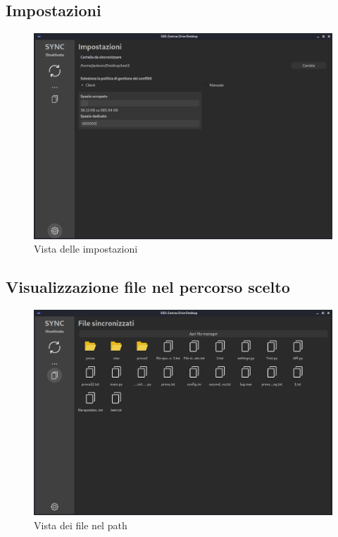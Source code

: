 \subsection{Impostazioni}
\begin{figure}[H]
    \centering
    \includegraphics[scale = 0.30]{components/img/settings.png}
    \caption{Vista delle impostazioni}
    \label{fig:Vista delle impostazioni}
\end{figure}
\subsection{Visualizzazione file nel percorso scelto}
\begin{figure}[H]
    \centering
    \includegraphics[scale = 0.30]{components/img/file-view.png}
    \caption{Vista dei file nel path}
    \label{fig:Vista dei file nel percorso scelto}
\end{figure}